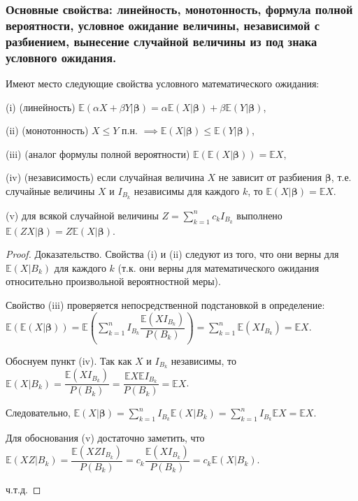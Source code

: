 \subsubsection{Основные свойства: линейность, монотонность, формула полной вероятности, условное ожидание величины, независимой с разбиением, вынесение случайной величины из под знака условного ожидания.}
\begin{theorem}
	Имеют место следующие свойства условного математического ожидания:
	
	(i) (линейность) $\mathbb{E}(\alpha X + \beta Y |\boldsymbol{\beta}) = \alpha\mathbb{E}(X|\boldsymbol{\beta}) + \beta\mathbb{E}(Y |\boldsymbol{\beta})$,
	
	(ii) (монотонность) $X \leqslant Y$ п.н. $\implies \mathbb{E}(X|\boldsymbol{\beta}) \leqslant \mathbb{E}(Y|\boldsymbol{\beta})$,
	
	(iii) (аналог формулы полной вероятности) $\mathbb{E}(\mathbb{E}(X|\boldsymbol{\beta})) = \mathbb{E}X$,
	
	(iv) (независимость) если случайная величина $X$ не зависит от разбиения $\boldsymbol{\beta}$, т.е.	случайные величины $X$ и $I_{B_k}$ независимы для каждого $k$, то $\mathbb{E}(X|\boldsymbol{\beta}) = \mathbb{E}X$.
	
	(v) для всякой случайной величины $Z = \sum_{k=1}^n	c_kI_{B_k}$	выполнено $\mathbb{E}(ZX|\boldsymbol{\beta}) = Z\mathbb{E}(X|\boldsymbol{\beta})$.
\end{theorem}
\begin{proof}
	Доказательство. Свойства (i) и (ii) следуют из того, что они верны для $\mathbb{E}(X|B_k)$ для каждого $k$ (т.к. они верны для математического ожидания относительно произвольной вероятностной меры). 
	
	Свойство (iii) проверяется непосредственной подстановкой в определение: $\mathbb{E}(\mathbb{E}(X|\boldsymbol{\beta}))= \mathbb{E}\left(\sum_{k=1}^nI_{B_k}\dfrac{\mathbb{E}(XI_{B_k})}{P(B_k)}\right)=\sum_{k=1}^n\mathbb{E}(XI_{B_k})=\mathbb{E}X$.
	
	Обоснуем пункт (iv). Так как $X$ и $I_{B_k}$ независимы, то $\mathbb{E}(X|B_k) = \dfrac{\mathbb{E}(XI_{B_k})}{P(B_k)}=\dfrac{\mathbb{E}X\mathbb{E}I_{B_k}}{P(B_k)}=\mathbb{E}X$.
	
	Следовательно, $\mathbb{E}(X|\boldsymbol{\beta}) = \sum_{k=1}^n I_{B_k}\mathbb{E}(X|B_k) = \sum_{k=1}^n I_{B_k}\mathbb{E}X = \mathbb{E}X$.
	
	Для обоснования (v) достаточно заметить, что $\mathbb{E}(XZ|B_k) = \dfrac{\mathbb{E}(XZI_{B_k})}{P(B_k)} = c_k \dfrac{\mathbb{E}(XI_{B_k})}{P(B_k)} = c_k\mathbb{E}(X|B_k)$.
	
	ч.т.д.
\end{proof}
